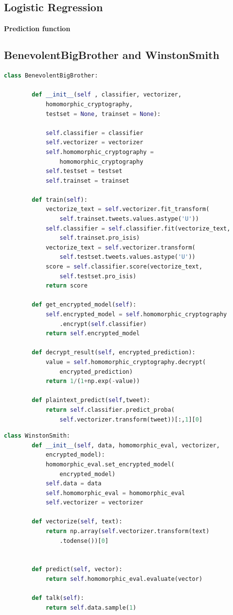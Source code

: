 \documentclass[10pt, a4paper]{article}
\begin{document}
	\subsection{Logistic Regression}
	
	\paragraph{Prediction function}
	\subsection{BenevolentBigBrother and WinstonSmith}
	
	
	\begin{lstlisting}[language=Python,caption = Benevolent Big Brother]
	class BenevolentBigBrother:
	
		def __init__(self , classifier, vectorizer, 
			homomorphic_cryptography, 
			testset = None, trainset = None):
			
			self.classifier = classifier
			self.vectorizer = vectorizer
			self.homomorphic_cryptography = 
				homomorphic_cryptography
			self.testset = testset
			self.trainset = trainset
		
		def train(self):
			vectorize_text = self.vectorizer.fit_transform(
				self.trainset.tweets.values.astype('U'))
			self.classifier = self.classifier.fit(vectorize_text, 
				self.trainset.pro_isis)
			vectorize_text = self.vectorizer.transform(
				self.testset.tweets.values.astype('U'))
			score = self.classifier.score(vectorize_text, 
				self.testset.pro_isis)
			return score
		
		def get_encrypted_model(self):
			self.encrypted_model = self.homomorphic_cryptography
				.encrypt(self.classifier)
			return self.encrypted_model
		
		def decrypt_result(self, encrypted_prediction):
			value = self.homomorphic_cryptography.decrypt(
				encrypted_prediction)
			return 1/(1+np.exp(-value))
		
		def plaintext_predict(self,tweet):
			return self.classifier.predict_proba(
				self.vectorizer.transform(tweet))[:,1][0]
	\end{lstlisting}
	
	\begin{lstlisting}[language=Python,caption = Winstom Smith]
	class WinstonSmith:
		def __init__(self, data, homomorphic_eval, vectorizer, 
			encrypted_model):
			homomorphic_eval.set_encrypted_model(
				encrypted_model)
			self.data = data
			self.homomorphic_eval = homomorphic_eval
			self.vectorizer = vectorizer
		
		def vectorize(self, text):
			return np.array(self.vectorizer.transform(text)
				.todense())[0]
		
		
		def predict(self, vector):
			return self.homomorphic_eval.evaluate(vector)
		
		def talk(self):
			return self.data.sample(1)
	\end{lstlisting}
	
\end{document}
